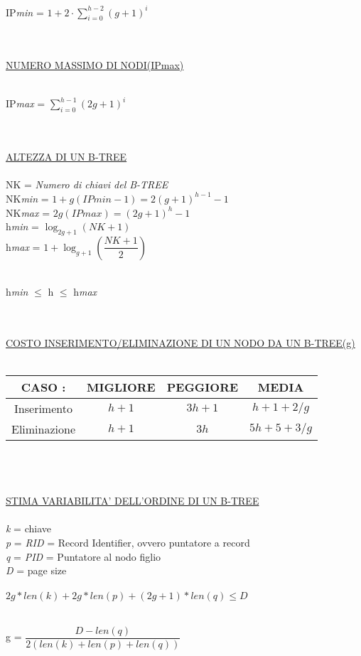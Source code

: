 \documentclass[a4paper,12pt]{article}
\begin{document}
\begin{titlepage}
			\centerline{{\Large {IP\textit{min} = ${1 + 2 \cdot \sum_{i=0}^{h-2}({g + 1})^i}$}}} \\ \\
			\underline{NUMERO MASSIMO DI NODI(IPmax)} \\ \\
			\centerline{{\Large {IP\textit{max} = ${\sum_{i=0}^{h-1}({2g + 1})^i}$}}} \\ \\
			\underline{ALTEZZA DI UN B-TREE} \\ \\
			NK = \textit{Numero di chiavi del B-TREE} \\ 
			NK\textit{min} = ${1 + g(IPmin - 1) = 2(g + 1)^{h-1}-1}$ \\
			NK\textit{max} = ${2g(IPmax) = (2g + 1)^{h}-1}$ \\ 
			h\textit{min} = ${\log_{2g+1}({NK + 1})}$ \\ 
			h\textit{max} = ${1 + \log_{g+1}{(\dfrac{NK + 1}{2})}}$ \\ \\
			\centerline{{\Large h\textit{min} ${\leq}$ h ${\leq}$ h\textit{max}}} \\ \\
			\underline{COSTO INSERIMENTO/ELIMINAZIONE DI UN NODO DA UN B-TREE(g)} \\ \\
			\begin{tabular}{|c|c|c|c|}
				\hline
				CASO : & MIGLIORE & PEGGIORE & MEDIA \\
				\hline
				Inserimento & ${h + 1}$ & ${3h + 1}$ & ${h + 1 + 2/g}$ \\
				\hline
				Eliminazione & ${h + 1}$ & ${3h}$ & ${5h + 5 + 3/g}$ \\
				\hline
			\end{tabular} \\ \\ \\
			\underline{STIMA VARIABILITA' DELL'ORDINE DI UN B-TREE} \\ \\
			\textit{k} = chiave \\
			\textit{p}  = \textit{RID} = Record Identifier, ovvero puntatore a record \\
			\textit{q} = \textit{PID} = Puntatore al nodo figlio \\
			\textit{D} = page size \\ \\
			${2g*len(k) + 2g*len(p) + (2g+1)*len(q) \leq D}$ \\ \\
			\centerline{{\Large g = ${\dfrac{D - len(q)}{2(len(k) + len(p) + len(q))}}$}} \\
	\end{titlepage}
\end{document}

